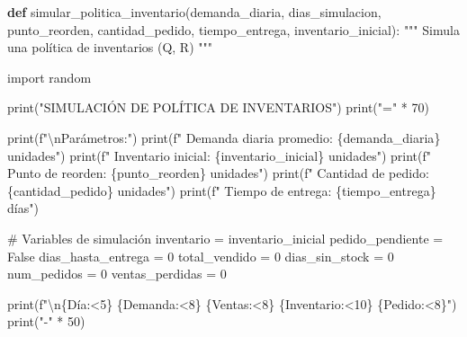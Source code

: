 \documentclass[
  doc,
  floatsintext,
  longtable,
  a4paper,
  nolmodern,
  notxfonts,
  notimes,
  12pt,
  colorlinks=true,linkcolor=blue,citecolor=blue,urlcolor=blue]{apa7}
\newenvironment{Shaded}{\begin{snugshade}}{\end{snugshade}}
\newcommand{\BuiltInTok}[1]{\textcolor[rgb]{0.00,0.23,0.31}{#1}}
\newcommand{\CharTok}[1]{\textcolor[rgb]{0.13,0.47,0.30}{#1}}
\newcommand{\CommentTok}[1]{\textcolor[rgb]{0.37,0.37,0.37}{#1}}
\newcommand{\DecValTok}[1]{\textcolor[rgb]{0.68,0.00,0.00}{#1}}
\newcommand{\ImportTok}[1]{\textcolor[rgb]{0.00,0.46,0.62}{#1}}
\newcommand{\KeywordTok}[1]{\textcolor[rgb]{0.00,0.23,0.31}{\textbf{#1}}}
\newcommand{\NormalTok}[1]{\textcolor[rgb]{0.00,0.23,0.31}{#1}}
\newcommand{\OperatorTok}[1]{\textcolor[rgb]{0.37,0.37,0.37}{#1}}
\newcommand{\SpecialCharTok}[1]{\textcolor[rgb]{0.37,0.37,0.37}{#1}}
\newcommand{\SpecialStringTok}[1]{\textcolor[rgb]{0.13,0.47,0.30}{#1}}
\newcommand{\StringTok}[1]{\textcolor[rgb]{0.13,0.47,0.30}{#1}}
\newcommand{\VariableTok}[1]{\textcolor[rgb]{0.07,0.07,0.07}{#1}}
\begin{document}
\begin{Shaded}
\begin{Highlighting}[]
\KeywordTok{def}\NormalTok{ simular\_politica\_inventario(demanda\_diaria, dias\_simulacion, }
\NormalTok{                                punto\_reorden, cantidad\_pedido,}
\NormalTok{                                tiempo\_entrega, inventario\_inicial):}
    \CommentTok{"""}
\CommentTok{    Simula una política de inventarios (Q, R)}
\CommentTok{    """}
    
    \ImportTok{import}\NormalTok{ random}
    
    \BuiltInTok{print}\NormalTok{(}\StringTok{"SIMULACIÓN DE POLÍTICA DE INVENTARIOS"}\NormalTok{)}
    \BuiltInTok{print}\NormalTok{(}\StringTok{"="} \OperatorTok{*} \DecValTok{70}\NormalTok{)}
    
    \BuiltInTok{print}\NormalTok{(}\SpecialStringTok{f"}\CharTok{\textbackslash{}n}\SpecialStringTok{Parámetros:"}\NormalTok{)}
    \BuiltInTok{print}\NormalTok{(}\SpecialStringTok{f"  Demanda diaria promedio: }\SpecialCharTok{\{}\NormalTok{demanda\_diaria}\SpecialCharTok{\}}\SpecialStringTok{ unidades"}\NormalTok{)}
    \BuiltInTok{print}\NormalTok{(}\SpecialStringTok{f"  Inventario inicial: }\SpecialCharTok{\{}\NormalTok{inventario\_inicial}\SpecialCharTok{\}}\SpecialStringTok{ unidades"}\NormalTok{)}
    \BuiltInTok{print}\NormalTok{(}\SpecialStringTok{f"  Punto de reorden: }\SpecialCharTok{\{}\NormalTok{punto\_reorden}\SpecialCharTok{\}}\SpecialStringTok{ unidades"}\NormalTok{)}
    \BuiltInTok{print}\NormalTok{(}\SpecialStringTok{f"  Cantidad de pedido: }\SpecialCharTok{\{}\NormalTok{cantidad\_pedido}\SpecialCharTok{\}}\SpecialStringTok{ unidades"}\NormalTok{)}
    \BuiltInTok{print}\NormalTok{(}\SpecialStringTok{f"  Tiempo de entrega: }\SpecialCharTok{\{}\NormalTok{tiempo\_entrega}\SpecialCharTok{\}}\SpecialStringTok{ días"}\NormalTok{)}
    
    \CommentTok{\# Variables de simulación}
\NormalTok{    inventario }\OperatorTok{=}\NormalTok{ inventario\_inicial}
\NormalTok{    pedido\_pendiente }\OperatorTok{=} \VariableTok{False}
\NormalTok{    dias\_hasta\_entrega }\OperatorTok{=} \DecValTok{0}
\NormalTok{    total\_vendido }\OperatorTok{=} \DecValTok{0}
\NormalTok{    dias\_sin\_stock }\OperatorTok{=} \DecValTok{0}
\NormalTok{    num\_pedidos }\OperatorTok{=} \DecValTok{0}
\NormalTok{    ventas\_perdidas }\OperatorTok{=} \DecValTok{0}
    
    \BuiltInTok{print}\NormalTok{(}\SpecialStringTok{f"}\CharTok{\textbackslash{}n}\SpecialCharTok{\{}\StringTok{\textquotesingle{}Día\textquotesingle{}}\SpecialCharTok{:\textless{}5\}}\SpecialStringTok{ }\SpecialCharTok{\{}\StringTok{\textquotesingle{}Demanda\textquotesingle{}}\SpecialCharTok{:\textless{}8\}}\SpecialStringTok{ }\SpecialCharTok{\{}\StringTok{\textquotesingle{}Ventas\textquotesingle{}}\SpecialCharTok{:\textless{}8\}}\SpecialStringTok{ }\SpecialCharTok{\{}\StringTok{\textquotesingle{}Inventario\textquotesingle{}}\SpecialCharTok{:\textless{}10\}}\SpecialStringTok{ }\SpecialCharTok{\{}\StringTok{\textquotesingle{}Pedido\textquotesingle{}}\SpecialCharTok{:\textless{}8\}}\SpecialStringTok{"}\NormalTok{)}
    \BuiltInTok{print}\NormalTok{(}\StringTok{"{-}"} \OperatorTok{*} \DecValTok{50}\NormalTok{)}
    

\end{Highlighting}
\end{Shaded}
\end{document}

